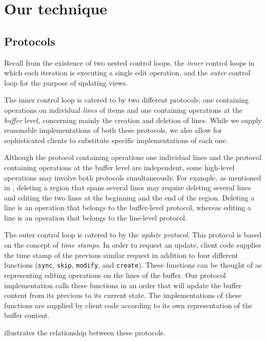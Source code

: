 \section{Our technique}
\label{sec-our-technique}

\subsection{Protocols}

Recall from  the existence of two nested
control loops, the \emph{inner} control loops in which each iteration
is executing a single edit operation, and the \emph{outer} control
loop for the purpose of updating views.

The inner control loop is catered to by two different protocols; one
containing operations on individual \emph{lines} of items and one
containing operations at the \emph{buffer} level, concerning mainly
the creation and deletion of lines.  While we supply reasonable
implementations of both these protocols, we also allow for
sophisticated clients to substitute specific implementations of each
one.

Although the protocol containing operations one individual lines and
the protocol containing operations at the buffer level are
independent, some high-level operations may involve both protocols
simultaneously.  For example, as mentioned in
, deleting a region that spans
several lines may require deleting several lines and editing the two
lines at the beginning and the end of the region.  Deleting a line is
an operation that belongs to the buffer-level protocol, whereas
editing a line is an operation that belongs to the line-level
protocol.

The outer control loop is catered to by the \emph{update protocol}.
This protocol is based on the concept of \emph{time stamps}.  In order
to request an update, client code supplies the time stamp of the
previous similar request in addition to four different functions
(\texttt{sync}, \texttt{skip}, \texttt{modify}, and \texttt{create}).
These functions can be thought of as representing editing operations
on the lines of the buffer.  Our protocol implementation calls these
functions in an order that will update the buffer content from its
previous to its current state.  The implementations of these functions
are supplied by client code according to its own representation of the
buffer content.

 illustrates the relationship between
these protocols.

